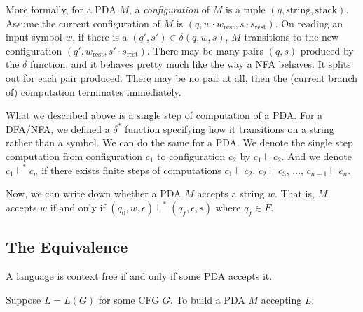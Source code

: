 \documentclass[11pt]{article}
\begin{document}
More formally, for a PDA $M$, a \emph{configuration} of $M$ is a tuple $(q,\mathrm{string},\mathrm{stack})$. Assume
the current configuration of $M$ is $(q,w \cdot w_{\text{rest}},s \cdot s_{\text{rest}})$. On
reading an input symbol $w$, if there is a $(q',s') \in \delta(q,w,s)$, $M$ transitions to the
new configuration $(q',w_{\text{rest}},s' \cdot s_{\text{rest}})$. There may be many pairs
$(q,s)$ produced by the $\delta$ function, and it behaves pretty much like the way a NFA behaves.
It splits out for each pair produced. There may be no pair at all, then the (current branch of)
computation terminates immediately.

What we described above is a single step of computation of a PDA. For a DFA/NFA, we defined a
$\delta^\ast$ function specifying how it transitions on a string rather than a symbol. We can
do the same for a PDA. We denote the single step computation from configuration $c_1$ to
configuration $c_2$ by $c_1 \vdash c_2$. And we denote $c_1 \vdash^\ast c_n$ if there exists
finite steps of computations $c_1 \vdash c_2$, $c_2 \vdash c_3$, $\dots$, $c_{n-1} \vdash c_n$.

Now, we can write down whether a PDA $M$ accepts a string $w$. That is, $M$ accepts $w$ if and only
if $(q_0,w,\epsilon) \vdash^\ast (q_f,\epsilon,s)$ where $q_f \in F$.

\subsection{The Equivalence}

\begin{theorem}
A language is context free if and only if some PDA accepts it.
\end{theorem}

Suppose $L = L(G)$ for some CFG $G$. To build a PDA $M$ accepting $L$:
\end{document}
